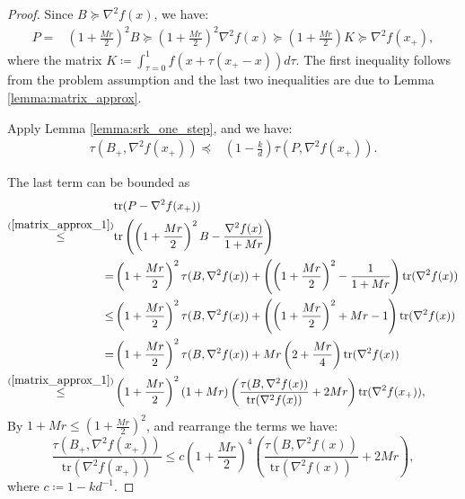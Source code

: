\documentclass[letterpaper]{article} %
\theoremstyle{plain}
\theoremstyle{definition}
\theoremstyle{remark}
\begin{document}
\begin{proof}
    Since $B \succeq \nabla^2 f(x)$, we have:
    \begin{align*}
        P =& (1 + \frac{M r}{2})^2 B \succeq (1 + \frac{M r}{2})^2 \nabla^2 f(x) \succeq (1 + \frac{Mr}{2}) K \succeq \nabla^2 f(x_+),
    \end{align*}
    where the matrix $K \coloneqq \int_{\tau = 0}^1 f(x + \tau (x_{+} - x)) d \tau$. 
    The first inequality follows from the problem assumption and the last two inequalities are due to Lemma \ref{lemma:matrix_approx}. 
   
    
    Apply Lemma \ref{lemma:srk_one_step}, and we have:
    \begin{align*}
        \tau(B_{+}, \nabla^2 f(x_{+})) \preceq & \left(1 - \frac{k}{d} \right) \tau(P, \nabla^2 f(x_{+})) .
    \end{align*}
    
    The last term can be bounded as 
    \begin{align*}
         & \mathrm{tr}(P - \nabla^2 f(x_{+})) \\
         \overset{(\ref{matrix_approx_1})}{\leq} & \mathrm{tr}\left(\left(1 + \frac{Mr}{2}\right)^2 B - \frac{\nabla^2 f(x)}{1 + M r}\right) \\
         = & \left(1 + \frac{Mr}{2}\right)^2 \tau (B, \nabla^2 f(x)) + \left(\left(1 + \frac{Mr}{2}\right)^2 - \frac{1}{1 + M r}\right) \mathrm{tr}(\nabla^2 f(x)) \\
         \leq & \left(1 + \frac{Mr}{2}\right)^2 \tau (B, \nabla^2 f(x)) + \left(\left(1 + \frac{Mr}{2}\right)^2 + Mr - 1\right) \mathrm{tr}(\nabla^2 f(x)) \\
         = & \left(1 + \frac{Mr}{2}\right)^2 \tau (B, \nabla^2 f(x)) +  M r \left( 2 + \frac{Mr}{4} \right) \mathrm{tr}(\nabla^2 f(x)) \\
         \overset{(\ref{matrix_approx_1})}{\leq} & \left(1 + \frac{Mr}{2}\right)^2 (1 + M r)\left(\frac{\tau (B, \nabla^2 f(x))}{\mathrm{tr}(\nabla^2 f(x))} +  2 M r  \right) \mathrm{tr}(\nabla^2 f(x_{+})), \\
    \end{align*}
    By $ 1 + Mr \leq (1 + \frac{Mr}{2})^2$, and rearrange the terms we have:
    \begin{equation*}
        \frac{\tau(B_{+}, \nabla^2 f(x_{+}))}{\mathrm{tr}(\nabla^2 f(x_{+}))} \leq c\left(1 + \frac{Mr}{2}\right)^4 \left(\frac{\tau (B, \nabla^2 f(x))}{\mathrm{tr}(\nabla^2 f(x))} + 2 M r  \right),
    \end{equation*}
    where $c\coloneqq 1 - k d^{-1}$.
\end{proof}
\end{document}
